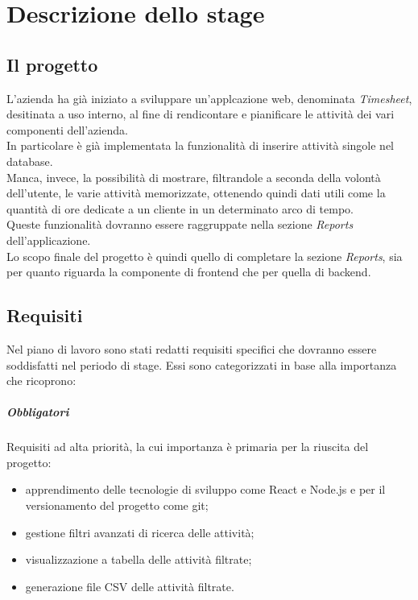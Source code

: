 
\chapter{Descrizione dello stage}
\label{cap:descrizionestage}

\section{Il progetto}

L'azienda ha già iniziato a sviluppare un'applcazione web, denominata \emph{Timesheet}, desitinata a uso interno, al fine di rendicontare e pianificare le attività dei vari componenti dell'azienda. \\
In particolare è già implementata la funzionalità di inserire attività singole nel database. \\
Manca, invece, la possibilità di mostrare, filtrandole a seconda della volontà dell'utente, le varie attività memorizzate, ottenendo quindi dati utili come la quantità di ore dedicate a un cliente in un determinato arco di tempo. \\
Queste funzionalità dovranno essere raggruppate nella sezione \emph{Reports} dell'applicazione. \\
Lo scopo finale del progetto è quindi quello di completare la sezione \emph{Reports}, sia per quanto riguarda la componente di frontend che per quella di backend.

\section{Requisiti}
\label{sec:requisiti}
Nel piano di lavoro sono stati redatti requisiti specifici che dovranno essere soddisfatti nel periodo di stage. Essi sono categorizzati in base alla importanza che ricoprono:


\paragraph{Obbligatori} Requisiti ad alta priorità, la cui importanza è primaria per la riuscita del progetto:

\begin{itemize}
  \item apprendimento delle tecnologie di sviluppo come React e Node.js e per il versionamento del progetto come git;
  \item gestione filtri avanzati di ricerca delle attività;
  \item visualizzazione a tabella delle attività filtrate;
  \item generazione file CSV delle attività filtrate.
\end{itemize}

